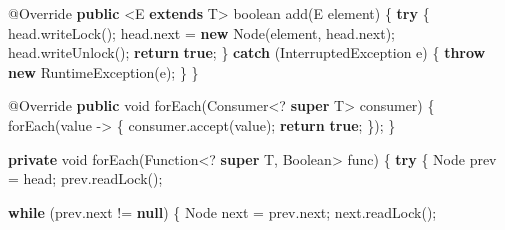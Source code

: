 \documentclass[11pt]{article}
\newenvironment{Shaded}{}{}
\newcommand{\KeywordTok}[1]{\textcolor[rgb]{0.00,0.44,0.13}{\textbf{{#1}}}}
\newcommand{\DataTypeTok}[1]{\textcolor[rgb]{0.56,0.13,0.00}{{#1}}}
\newcommand{\FunctionTok}[1]{\textcolor[rgb]{0.02,0.16,0.49}{{#1}}}
\newcommand{\NormalTok}[1]{{#1}}
\newcommand{\ControlFlowTok}[1]{\textcolor[rgb]{0.00,0.44,0.13}{\textbf{{#1}}}}
\newcommand{\OperatorTok}[1]{\textcolor[rgb]{0.40,0.40,0.40}{{#1}}}
\newcommand{\BuiltInTok}[1]{{#1}}
\newcommand{\AttributeTok}[1]{\textcolor[rgb]{0.49,0.56,0.16}{{#1}}}
\begin{document}
\begin{Shaded}
\begin{Highlighting}[]
    \AttributeTok{@Override}
    \KeywordTok{public} \OperatorTok{\textless{}}\NormalTok{E }\KeywordTok{extends}\NormalTok{ T}\OperatorTok{\textgreater{}} \DataTypeTok{boolean} \FunctionTok{add}\OperatorTok{(}\NormalTok{E element}\OperatorTok{)} \OperatorTok{\{}
        \ControlFlowTok{try} \OperatorTok{\{}
\NormalTok{            head}\OperatorTok{.}\FunctionTok{writeLock}\OperatorTok{();}
\NormalTok{            head}\OperatorTok{.}\FunctionTok{next} \OperatorTok{=} \KeywordTok{new} \BuiltInTok{Node}\OperatorTok{(}\NormalTok{element}\OperatorTok{,}\NormalTok{ head}\OperatorTok{.}\FunctionTok{next}\OperatorTok{);}
\NormalTok{            head}\OperatorTok{.}\FunctionTok{writeUnlock}\OperatorTok{();}
            \ControlFlowTok{return} \KeywordTok{true}\OperatorTok{;}
        \OperatorTok{\}} \ControlFlowTok{catch} \OperatorTok{(}\BuiltInTok{InterruptedException}\NormalTok{ e}\OperatorTok{)} \OperatorTok{\{}
            \ControlFlowTok{throw} \KeywordTok{new} \BuiltInTok{RuntimeException}\OperatorTok{(}\NormalTok{e}\OperatorTok{);}
        \OperatorTok{\}}
    \OperatorTok{\}}

    \AttributeTok{@Override}
    \KeywordTok{public} \DataTypeTok{void} \FunctionTok{forEach}\OperatorTok{(}\NormalTok{Consumer}\OperatorTok{\textless{}?} \KeywordTok{super}\NormalTok{ T}\OperatorTok{\textgreater{}}\NormalTok{ consumer}\OperatorTok{)} \OperatorTok{\{}
        \FunctionTok{forEach}\OperatorTok{(}\NormalTok{value }\OperatorTok{{-}\textgreater{}} \OperatorTok{\{}
\NormalTok{            consumer}\OperatorTok{.}\FunctionTok{accept}\OperatorTok{(}\NormalTok{value}\OperatorTok{);}
            \ControlFlowTok{return} \KeywordTok{true}\OperatorTok{;}
        \OperatorTok{\});}
    \OperatorTok{\}}

    \KeywordTok{private} \DataTypeTok{void} \FunctionTok{forEach}\OperatorTok{(}\NormalTok{Function}\OperatorTok{\textless{}?} \KeywordTok{super}\NormalTok{ T}\OperatorTok{,} \BuiltInTok{Boolean}\OperatorTok{\textgreater{}}\NormalTok{ func}\OperatorTok{)} \OperatorTok{\{}
        \ControlFlowTok{try} \OperatorTok{\{}
            \BuiltInTok{Node}\NormalTok{ prev }\OperatorTok{=}\NormalTok{ head}\OperatorTok{;}
\NormalTok{            prev}\OperatorTok{.}\FunctionTok{readLock}\OperatorTok{();}

            \ControlFlowTok{while} \OperatorTok{(}\NormalTok{prev}\OperatorTok{.}\FunctionTok{next} \OperatorTok{!=} \KeywordTok{null}\OperatorTok{)} \OperatorTok{\{}
                \BuiltInTok{Node}\NormalTok{ next }\OperatorTok{=}\NormalTok{ prev}\OperatorTok{.}\FunctionTok{next}\OperatorTok{;}
\NormalTok{                next}\OperatorTok{.}\FunctionTok{readLock}\OperatorTok{();}


\end{Highlighting}
\end{Shaded}
\end{document}
